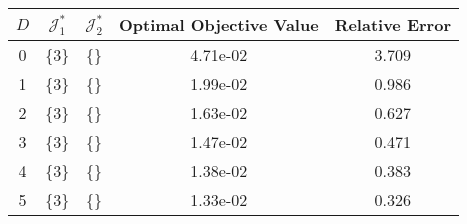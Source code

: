 \begin{subtable}{\textwidth}
\centering
\begin{tabular}{|c|c|c|c|c|}
  \hline
$D$ & $\mathcal J_1^*$ & $\mathcal J_2^*$ & Optimal Objective Value & Relative Error \\ 
  \hline
0 & \{3\} & \{\} & 4.71e-02 & 3.709 \\ 
  1 & \{3\} & \{\} & 1.99e-02 & 0.986 \\ 
  2 & \{3\} & \{\} & 1.63e-02 & 0.627 \\ 
  3 & \{3\} & \{\} & 1.47e-02 & 0.471 \\ 
  4 & \{3\} & \{\} & 1.38e-02 & 0.383 \\ 
  5 & \{3\} & \{\} & 1.33e-02 & 0.326 \\ 
   \hline
\end{tabular}
\end{subtable}
